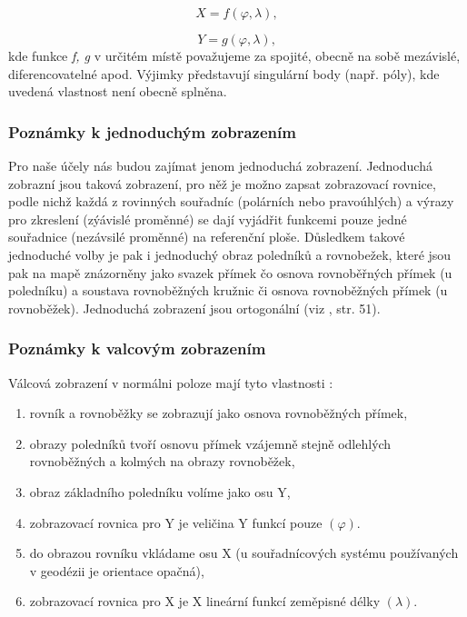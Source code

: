\documentclass[11pt,a4paper]{article}
\begin{document}
\begin{equation}
X = f\left(\varphi, \lambda\right),
\end{equation}


\begin{equation}
Y = g\left(\varphi, \lambda\right),
\end{equation}
kde funkce \textit{f, g} v určitém místě považujeme za spojité, obecně na sobě mezávislé, diferencovatelné apod. Výjimky představují singulární body (např. póly), kde uvedená vlastnost není obecně splněna.

\subsubsection{Poznámky k jednoduchým zobrazením}
Pro naše účely nás budou zajímat jenom jednoduchá zobrazení. Jednoduchá zobrazní jsou taková zobrazení, pro něž je možno zapsat zobrazovací rovnice, podle nichž každá  z rovinných souřadníc (polárních nebo pravoúhlých) a výrazy pro zkreslení (zýávislé proměnné) se dají vyjádřit funkcemi pouze jedné souřadnice (nezávsilé proměnné) na referenční ploše. Důsledkem takové jednoduché volby je pak i jednoduchý obraz poledníků a rovnobežek, které jsou pak na mapě znázorněny jako svazek přímek čo osnova rovnoběřných přímek (u poledníku) a soustava rovnoběžných kružnic či osnova rovnoběžných přímek (u rovnoběžek). Jednoduchá zobrazení jsou ortogonální (viz \cite{Buchar2002}, str. 51).

\subsubsection{Poznámky k valcovým zobrazením}
Válcová zobrazení v normálni poloze mají tyto vlastnosti \cite{Buchar2002}:
\begin{enumerate}
\item rovník a rovnoběžky se zobrazují jako osnova rovnoběžných přímek,
\item obrazy poledníků tvoří osnovu přímek vzájemně stejně odlehlých rovnoběžných a kolmých na obrazy rovnoběžek,
\item obraz základního poledníku volíme jako osu Y, 
\item zobrazovací rovnica pro Y je veličina Y funkcí pouze $\left(\varphi\right)$.
\item do obrazou rovníku vkládame osu X (u souřadnícových systému používaných v geodézii je orientace opačná),
\item zobrazovací rovnica pro X je X lineární funkcí zeměpisné délky $\left(\lambda\right)$.
\end{enumerate}
\end{document}
